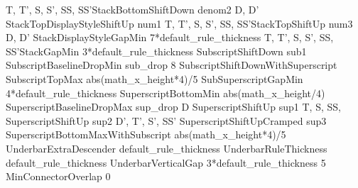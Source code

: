 \MathLine{\Umathstackdenomdown}           {}   {T, T', S, S', SS, SS'}{StackBottomShiftDown}                    {denom2}
\MathLine{\Umathstacknumup}               {}   {D, D'}                {StackTopDisplayStyleShiftUp}             {num1}
\MathLine{\Umathstacknumup}               {}   {T, T', S, S', SS, SS'}{StackTopShiftUp}                         {num3}
\MathLine{\Umathstackvgap}                {}   {D, D'}                {StackDisplayStyleGapMin}                 {7*default_rule_thickness}
\MathLine{\Umathstackvgap}                {}   {T, T', S, S', SS, SS'}{StackGapMin}                             {3*default_rule_thickness}
\MathLine{\Umathsubshiftdown}             {}   {}                     {SubscriptShiftDown}                      {sub1}
\MathLine{\Umathsubshiftdrop}             {}   {}                     {SubscriptBaselineDropMin}                {sub_drop}
\MathLine{\Umathsubsupshiftdown}          {8}  {}                     {SubscriptShiftDownWithSuperscript}       {\emdash}
\MathLine{\Umathsubtopmax}                {}   {}                     {SubscriptTopMax}                         {abs(math_x_height*4)/5}
\MathLine{\Umathsubsupvgap}               {}   {}                     {SubSuperscriptGapMin}                    {4*default_rule_thickness}
\MathLine{\Umathsupbottommin}             {}   {}                     {SuperscriptBottomMin}                    {abs(math_x_height/4)}
\MathLine{\Umathsupshiftdrop}             {}   {}                     {SuperscriptBaselineDropMax}              {sup_drop}
\MathLine{\Umathsupshiftup}               {}   {D}                    {SuperscriptShiftUp}                      {sup1}
\MathLine{\Umathsupshiftup}               {}   {T, S, SS,}            {SuperscriptShiftUp}                      {sup2}
\MathLine{\Umathsupshiftup}               {}   {D', T', S', SS'}      {SuperscriptShiftUpCramped}               {sup3}
\MathLine{\Umathsupsubbottommax}          {}   {}                     {SuperscriptBottomMaxWithSubscript}       {abs(math_x_height*4)/5}
\MathLine{\Umathunderbarkern}             {}   {}                     {UnderbarExtraDescender}                  {default_rule_thickness}
\MathLine{\Umathunderbarrule}             {}   {}                     {UnderbarRuleThickness}                   {default_rule_thickness}
\MathLine{\Umathunderbarvgap}             {}   {}                     {UnderbarVerticalGap}                     {3*default_rule_thickness}
\MathLine{\Umathconnectoroverlapmin}      {5}  {}                     {MinConnectorOverlap}                     {0}
\LL
\stoptabulate

